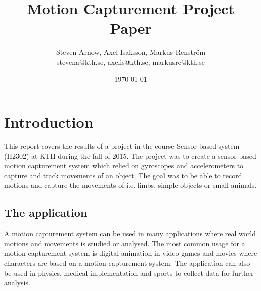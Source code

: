\documentclass[a4paper, 12pt]{article}
\title{Motion Capturement Project Paper}
\author{Steven Arnow, Axel Isaksson, Markus Renström\\stevena@kth.se, axelis@kth.se, markusre@kth.se}
\date{\today{}}
\begin{document}
\maketitle







\section*{Introduction}
This report covers the results of a project in the course Sensor based system (II2302) at KTH during the fall of 2015\cite{kursp}. The project was to create a sensor based motion capturement system which relied on gyroscopes and accelerometers to capture and track movements of an object. The goal was to be able to record motions and capture the movements of i.e. limbs, simple objects or small animals.

\subsection*{The application}
A motion capturement system \cite{wiki} can be used in many applications where real world motions and movements is studied or analysed. The most common usage for a motion capturement system is digital animation in video games and movies where characters are based on a motion capturement system. The application can also be used in physics, medical implementation and sports to collect data for further analysis.
\end{document}
